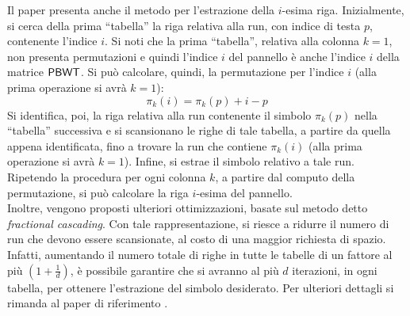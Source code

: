 Il paper presenta anche il metodo per l'estrazione della $i$-esima
riga. Inizialmente, si cerca della prima ``tabella'' la riga relativa alla run,
con indice di testa $p$, contenente l'indice $i$. Si noti che la prima
``tabella'', relativa alla colonna $k=1$, non presenta permutazioni e quindi  
l'indice $i$ del pannello è anche l'indice $i$ della matrice $\mbox{\rm {\sf PBWT}}$.
Si può calcolare, quindi, la permutazione per l'indice $i$ (alla prima
operazione si avrà $k=1$):
\begin{equation}
  \label{eq:pbwttrick2}
  \pi_k(i)=\pi_k(p)+i-p
\end{equation}
Si identifica, poi, la riga relativa alla run contenente il simbolo $\pi_k(p)$
nella ``tabella'' successiva e si scansionano le righe di tale tabella, a
partire da quella appena identificata, fino a trovare la run che contiene
$\pi_k(i)$ (alla prima
operazione si avrà $k=1$). Infine, si estrae il simbolo relativo a tale run.
Ripetendo la procedura per ogni colonna $k$, a partire dal computo della
permutazione, si 
può calcolare la riga $i$-esima del pannello.\\
Inoltre,
vengono proposti ulteriori ottimizzazioni, basate sul metodo detto
\textit{fractional cascading}. Con tale rappresentazione, si riesce a ridurre il
numero di run che devono essere scansionate, al costo di una
maggior richiesta di spazio. Infatti, aumentando il numero totale di
righe in tutte le tabelle di un fattore al più $\left(1+\frac{1}{d}\right)$, è
possibile garantire che si avranno al più $d$ iterazioni, in ogni tabella, per
ottenere l'estrazione del simbolo desiderato.
Per ulteriori dettagli si rimanda al paper di riferimento \cite{tricks}.
